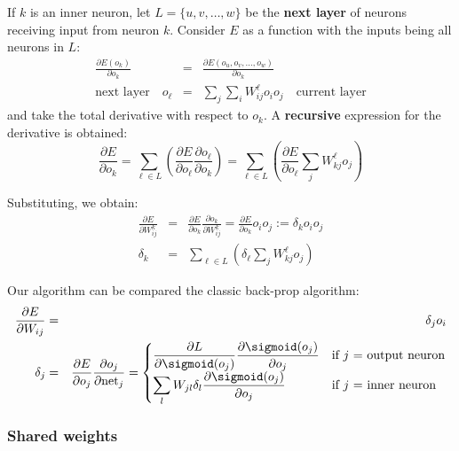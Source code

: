 If $k$ is an inner neuron, let $L = \{ u, v, \dots , w \}$ be the \textbf{next layer} of neurons receiving input from neuron $k$.  Consider $E$ as a function with the inputs being all neurons in $L$:
\begin{eqnarray}
\frac{\partial E(o_k)}{\partial o_k}
&=& \frac{\partial E(o_u, o_v, \dots, o_w)}{\partial o_k} \nonumber \\
\boxed{\mbox{next layer}} \quad
	o_{\ell} &=& \sum_j \sum_i W_{ij}^{\ell} o_i o_j
\quad \boxed{\mbox{current layer}}
\end{eqnarray}
and take the total derivative with respect to $o_k$.  A \textbf{recursive} expression for the derivative is obtained:
\begin{equation}
	\label{eqn:dE-do-k}
\frac{\partial E}{\partial o_k}
= \sum_{\ell \in L} \left( \frac{\partial E}{\partial o_{\ell}} \frac{\partial o_{\ell}}{\partial o_k} \right)
= \sum_{\ell \in L} \left( \frac{\partial E}{\partial o_{\ell}} \sum_j W_{kj}^{\ell} o_j \right)
\end{equation}

Substituting, we obtain:
\begin{eqnarray}
\frac{\partial E}{\partial W_{ij}^k}
&=& \frac{\partial E}{\partial o_k} \frac{\partial o_k}{\partial W_{ij}^k}
= \frac{\partial E}{\partial o_k} o_i o_j := \delta_k o_i o_j \nonumber \\ 
\delta_k &=& \sum_{\ell \in L} \left( \delta_{\ell} \sum_j W_{kj}^{\ell} o_j \right)
\end{eqnarray}

Our algorithm can be compared the classic back-prop algorithm:
\begin{eqnarray}
\frac{\partial E}{\partial W_{i j}} &=& \delta_j o_i \nonumber \\
\delta_j &=& \frac{\partial E}{\partial o_j} \frac{\partial o_j}{\partial \mathrm{net}_j} =
	\begin{cases}
	\displaystyle
	\frac{\partial L}{\partial \sigmoid(o_j)} \frac{\partial \sigmoid(o_j)}{\partial o_j} & \text{if $j$ = output neuron} \\
	\displaystyle
	\sum_l W_{j l} \delta_l \frac{\partial \sigmoid(o_j)}{\partial o_j} &  \text{if $j$ = inner neuron} 
	\end{cases}
\end{eqnarray}

\subsubsection{Shared weights}

